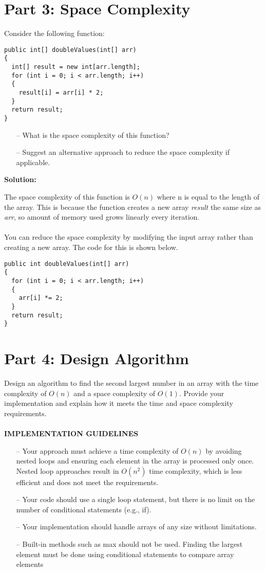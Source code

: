 \documentclass{article}
\begin{document}
\section*{Part 3: Space Complexity}
Consider the following function:
\begin{lstlisting}
public int[] doubleValues(int[] arr)
{
  int[] result = new int[arr.length];
  for (int i = 0; i < arr.length; i++) 
  {
    result[i] = arr[i] * 2;
  }
  return result;
}
\end{lstlisting}
\begin{itemize}
    \item [--] What is the space complexity of this function?
    \item [--] Suggest an alternative approach to reduce the space complexity if applicable.
\end{itemize}
\textbf{Solution:}
\begin{myindentpar}{.5cm}
    The space complexity of this function is \(O(n)\) where n is equal to the length of the array. This is because the function creates a new array \textit{result} the same size as \textit{arr}, so amount of memory used grows linearly every iteration. \\ \\
    You can reduce the space complexity by modifying the input array rather than creating a new array. The code for this is shown below.
    \begin{lstlisting}
public int doubleValues(int[] arr) 
{
  for (int i = 0; i < arr.length; i++) 
  {
    arr[i] *= 2;
  }
  return result;
}
    \end{lstlisting}
\end{myindentpar}

\pagebreak

\section*{Part 4: Design Algorithm}
Design an algorithm to find the second largest number in an array with the time complexity of \(O(n)\) and a space complexity of \(O(1)\). Provide your implementation and explain how it meets the time and space complexity requirements. \\ \\
\textbf{IMPLEMENTATION GUIDELINES} 
\begin{itemize}
    \item [--]Your approach must achieve a time complexity of \(O(n)\) by avoiding nested loops and ensuring each element in the array is processed only once. Nested loop approaches result in \(O(n^2)\) time complexity, which is less efficient and does not meet the requirements.
    \item [--]Your code should use a single loop statement, but there is no limit on the number of conditional statements (e.g., if).
    \item[--]Your implementation should handle arrays of any size without limitations.
    \item[--] Built-in methods such as max should not be used. Finding the largest element must be done using conditional statements to compare array elements
\end{itemize}
\end{document}
